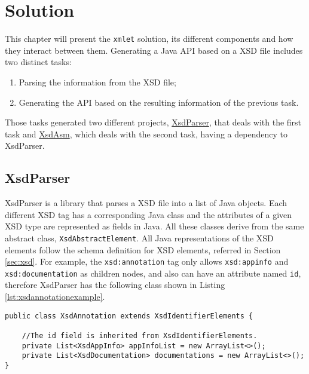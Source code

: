 \chapter{Solution}
\label{cha:solution}

\sloppy

This chapter will present the \texttt{xmlet} solution, its different components and how they interact between them. Generating a Java \ac{API} based on a \ac{XSD} file includes two distinct tasks:

\begin{enumerate}
\item Parsing the information from the \ac{XSD} file;
\item Generating the \ac{API} based on the resulting information of the previous task.
\end{enumerate}

\noindent
Those tasks generated two different projects, \hyperref[sec:xsdparser]{XsdParser}, that deals with the first task and \hyperref[sec:xsdasm]{XsdAsm}, which deals with the second task, having a dependency to XsdParser.

\section{XsdParser} %
\label{sec:xsdparser}

XsdParser is a library that parses a \ac{XSD} file into a list of Java objects. Each different \ac{XSD} tag has a corresponding Java class and the  attributes of a given \ac{XSD} type are represented as fields in Java. All these classes derive from the same abstract class, \texttt{XsdAbstractElement}. All Java representations of the \ac{XSD} elements follow the schema definition for \ac{XSD} elements, referred in Section \ref{sec:xsd}. For example, the \texttt{xsd:annotation} tag only allows \texttt{xsd:appinfo} and \texttt{xsd:documentation} as children nodes, and also can have an attribute named \texttt{id}, therefore XsdParser has the following class shown in Listing \ref{lst:xsdannotationexample}.

\bigskip

\lstset{language=Java}
\begin{minipage}{\linewidth}
\begin{lstlisting}[caption={XsdAnnotation class (simplified)},captionpos=b,label={lst:xsdannotationexample}]
public class XsdAnnotation extends XsdIdentifierElements {

    //The id field is inherited from XsdIdentifierElements.
    private List<XsdAppInfo> appInfoList = new ArrayList<>();
    private List<XsdDocumentation> documentations = new ArrayList<>();
}
\end{lstlisting}
\end{minipage}

